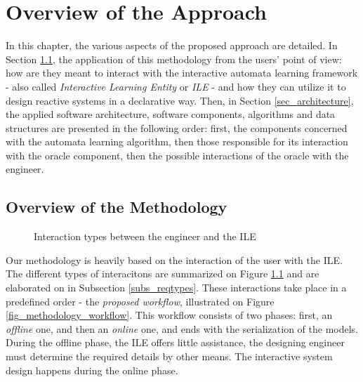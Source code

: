 \chapter{Overview of the Approach}
In this chapter, the various aspects of the proposed approach are detailed. In Section \ref{sec_methodology}, the application of this methodology from the users' point of view: how are they meant to interact with the interactive automata learning framework - also called \textit{Interactive Learning Entity} or \textit{ILE} - and how they can utilize it to design reactive systems in a declarative way. Then, in Section \ref{sec_architecture}, the applied software architecture, software components, algorithms and data structures are presented in the following order: first, the components concerned with the automata learning algorithm, then those responsible for its interaction with the oracle component, then the possible interactions of the oracle with the engineer.
\section{Overview of the Methodology} \label{sec_methodology}
\begin{figure}[!ht] 
	\centering
	\caption{Interaction types between the engineer and the ILE}
	\label{fig_methodology_interactiontypes}
\end{figure}

Our methodology is heavily based on the interaction of the user with the ILE. The different types of interacitons are summarized on Figure \ref{fig_methodology_interactiontypes} and are elaborated on in Subsection \ref{subs_reqtypes}. These interactions take place in a predefined order - the \textit{proposed workflow}, illustrated on Figure \ref{fig_methodology_workflow}. This workflow consists of two phases: first, an \textit{offline} one, and then an \textit{online} one, and ends with the serialization of the models. During the offline phase, the ILE offers little assistance, the designing engineer must determine the required details by other means. The interactive system design happens during the online phase. 

